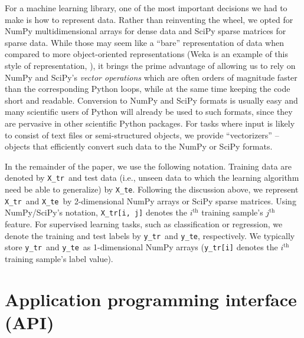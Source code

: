 \documentclass[a4paper]{article}
\newcommand{\Xtr}{\texttt{X\_tr}}
\newcommand{\Xte}{\texttt{X\_te}}
\newcommand{\ytr}{\texttt{y\_tr}}
\newcommand{\yte}{\texttt{y\_te}}
\begin{document}
For a machine learning library, one of the most important decisions we had to
make is how to represent data.  Rather than reinventing the wheel, we opted for
NumPy multidimensional arrays  for dense data and SciPy
sparse matrices for sparse data.  While those may seem like a ``bare''
representation of data when compared to more object-oriented representations
(Weka is an example of this style of representation, \citealp{hall2009weka}),
it brings the prime advantage of allowing us to rely on NumPy and SciPy's
\textit{vector operations} which are often orders of magnitude faster
than the corresponding Python loops,
while at the same time keeping the code short and readable.
Conversion to NumPy and SciPy formats is usually easy and many scientific users
of Python will already be used to such formats, since they are pervasive in
other scientific Python packages.  For tasks where input is likely to consist
of text files or semi-structured objects, we provide ``vectorizers'' -- objects
that efficiently convert such data to the NumPy or SciPy formats.

In the remainder of the paper, we use the following notation. Training data are
denoted by \Xtr ~and test data (i.e., unseen data to which the learning
algorithm need be able to generalize) by \Xte.  Following the discussion above,
we represent \Xtr ~and \Xte ~by 2-dimensional NumPy arrays or SciPy sparse
matrices. Using NumPy/SciPy's notation, \Xtr\texttt{[i, j]} denotes the
$i^\textrm{th}$ training sample's $j^\textrm{th}$ feature. For supervised learning tasks,
such as classification or regression, we denote the training and test labels by
\ytr ~and \yte, respectively. We typically store \ytr ~and \yte ~as
1-dimensional NumPy arrays (\ytr\texttt{[i]} denotes the $i^\textrm{th}$ training
sample's label value).

\section{Application programming interface (API)}
\end{document}
